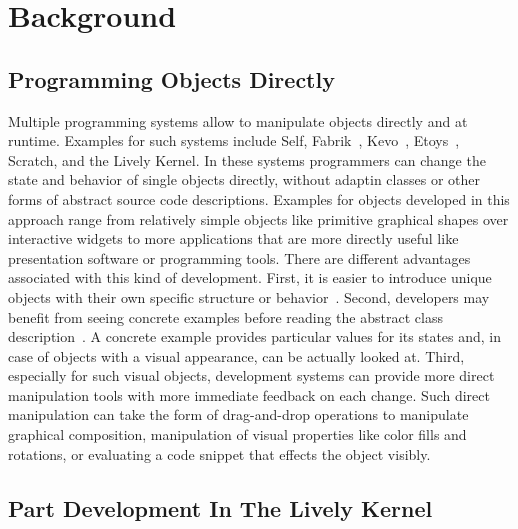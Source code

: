 \chapter{Background} \label{chapter:BACKGROUND}



\section{Programming Objects Directly}

Multiple programming systems allow to manipulate objects directly and at runtime.
Examples for such systems include Self, Fabrik~\cite{Ingalls1988FVP}, Kevo~\cite{Tailvalsaari1992Kevo}, Etoys~\cite{Kay2005Etoys}, Scratch\cite{Maloney2010SPL}, and the Lively Kernel.
In these systems programmers can change the state and behavior of single objects directly, without adaptin classes or other forms of abstract source code descriptions. 
Examples for objects developed in this approach range from relatively simple objects like primitive graphical shapes over interactive widgets to more applications that are more directly useful like presentation software or programming tools.
There are different advantages associated with this kind of development.
First, it is easier to introduce unique objects with their own specific structure or behavior~. 
Second, developers may benefit from seeing concrete examples before reading the abstract class description~.
A concrete example provides particular values for its states and, in case of objects with a visual appearance, can be actually looked at.
Third, especially for such visual objects, development systems can provide more direct manipulation tools with more immediate feedback on each change.
Such direct manipulation can take the form of drag-and-drop operations to manipulate graphical composition, manipulation of visual properties like color fills and rotations, or evaluating a code snippet that effects the object visibly.



\section{Part Development In The Lively Kernel}

